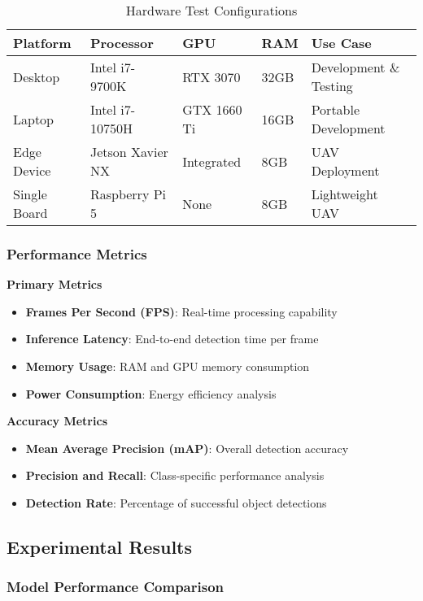 \documentclass[12pt,a4paper]{article}
\begin{document}
\begin{table}[H]
\centering
\caption{Hardware Test Configurations}
\begin{tabular}{@{}lllll@{}}
\toprule
\textbf{Platform} & \textbf{Processor} & \textbf{GPU} & \textbf{RAM} & \textbf{Use Case} \\
\midrule
Desktop & Intel i7-9700K & RTX 3070 & 32GB & Development \& Testing \\
Laptop & Intel i7-10750H & GTX 1660 Ti & 16GB & Portable Development \\
Edge Device & Jetson Xavier NX & Integrated & 8GB & UAV Deployment \\
Single Board & Raspberry Pi 5 & None & 8GB & Lightweight UAV \\
\bottomrule
\end{tabular}
\end{table}

\subsubsection{Performance Metrics}

\textbf{Primary Metrics}
\begin{itemize}
    \item \textbf{Frames Per Second (FPS)}: Real-time processing capability
    \item \textbf{Inference Latency}: End-to-end detection time per frame
    \item \textbf{Memory Usage}: RAM and GPU memory consumption
    \item \textbf{Power Consumption}: Energy efficiency analysis
\end{itemize}

\textbf{Accuracy Metrics}
\begin{itemize}
    \item \textbf{Mean Average Precision (mAP)}: Overall detection accuracy
    \item \textbf{Precision and Recall}: Class-specific performance analysis
    \item \textbf{Detection Rate}: Percentage of successful object detections
\end{itemize}

\subsection{Experimental Results}

\subsubsection{Model Performance Comparison}
\end{document}
